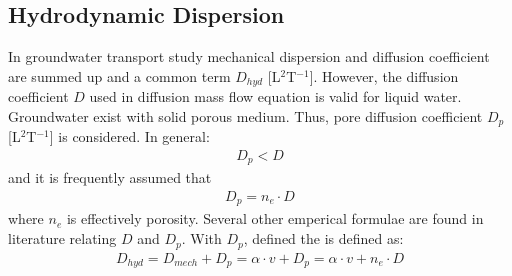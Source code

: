 \documentclass[letterpaper,10pt,english]{jupyterBook}
\begin{document}
\subsection{Hydrodynamic Dispersion}
\label{\detokenize{content/transport/L9/21_conservative_transport:id1}}
\sphinxAtStartPar
In groundwater transport study mechanical dispersion and diffusion coefficient are summed up and a common term  \(D_{hyd}\) {[}L\(^2\)T\(^{-1}\){]}. However, the diffusion coefficient \(D\) used in diffusion mass flow equation is valid for liquid water. Groundwater exist with solid porous medium. Thus, pore diffusion coefficient \(D_p\) {[}L\(^2\)T\(^{-1}\){]} is considered. In general:
\begin{equation*}
\begin{split}
D_p < D
\end{split}
\end{equation*}
\sphinxAtStartPar
and it is frequently assumed that
\begin{equation*}
\begin{split}
D_p = n_e \cdot D
\end{split}
\end{equation*}
\sphinxAtStartPar
where \(n_e\) is effectively porosity. Several other emperical formulae are found in literature relating \(D\) and \(D_p\). With \(D_p\), defined the  is defined as:
\begin{equation*}
\begin{split}
D_{hyd} = D_{mech} + D_p = \alpha \cdot v + D_p = \alpha \cdot v + n_e \cdot D
\end{split}
\end{equation*}
\end{document}
